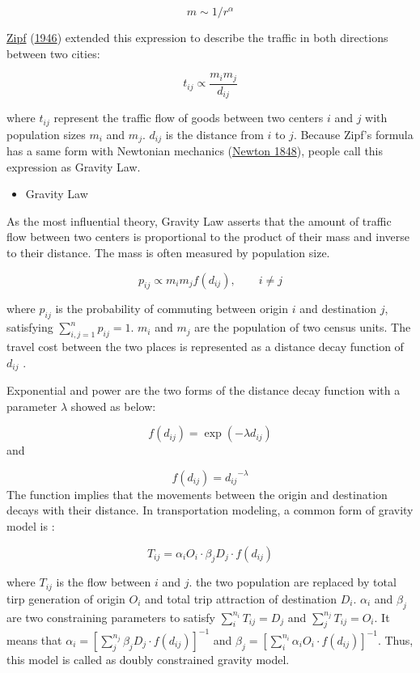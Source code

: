 \documentclass[
  11pt,
  openany]{memoir}
\providecommand{\tightlist}{%
  \setlength{\itemsep}{0pt}\setlength{\parskip}{0pt}}
\begin{document}
\[
m \sim 1 / r^{\alpha}
\]

\protect\hyperlink{ref-zipfP1P2Hypothesis1946}{Zipf} (\protect\hyperlink{ref-zipfP1P2Hypothesis1946}{1946}) extended this expression to describe the traffic in both directions between two cities:

\[
t_{ij}\propto \frac{m_i m_j} {d_{ij}}
\]

where \(t_{ij}\) represent the traffic flow of goods between two centers \(i\) and \(j\) with population sizes \(m_i\) and \(m_j\). \(d_{ij}\) is the distance from \(i\) to \(j\). Because Zipf's formula has a same form with Newtonian mechanics (\protect\hyperlink{ref-newton18481687}{Newton 1848}), people call this expression as Gravity Law.

\begin{itemize}
\tightlist
\item
  Gravity Law
\end{itemize}

As the most influential theory, Gravity Law asserts that the amount of traffic flow between two centers is proportional to the product of their mass and inverse to their distance. The mass is often measured by population size.

\begin{equation}
p_{ij}\propto m_i m_j f(d_{ij}), \qquad i\ne j 
\label{eq:gravity-law}
\end{equation}

where \(p_{ij}\) is the probability of commuting between origin \(i\) and destination \(j\), satisfying \(\sum_{i,j=1}^n p_{ij}=1\). \(m_i\) and \(m_j\) are the population of two census units. The travel cost between the two places is represented as a distance decay function of \(d_{ij}\) .

Exponential and power are the two forms of the distance decay function with a parameter \(\lambda\) showed as below:

\[
f(d_{ij})=\exp(-\lambda d_{ij})
\] and

\[
f(d_{ij})={d_{ij}}^{-\lambda}
\] The function implies that the movements between the origin and destination decays with their distance. In transportation modeling, a common form of gravity model is :

\[
T_{ij}= \alpha_i O_i \cdot \beta_j D_j \cdot f(d_{ij})
\]

where \(T_{ij}\) is the flow between \(i\) and \(j\). the two population are replaced by total tirp generation of origin \(O_i\) and total trip attraction of destination \(D_i\). \(\alpha_i\) and \(\beta_j\) are two constraining parameters to satisfy \(\sum_{i}^{n_i}T_{ij} = D_j\) and \(\sum_{j}^{n_j}T_{ij} = O_i\). It means that \(\alpha_i = [\sum_{j}^{n_j} \beta_j D_j \cdot f(d_{ij})]^{-1}\) and \(\beta_j = [\sum_{i}^{n_i} \alpha_i O_i \cdot f(d_{ij})]^{-1}\). Thus, this model is called as doubly constrained gravity model.
\end{document}

